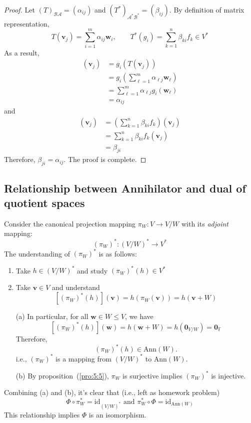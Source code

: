 \begin{proof}
Let $(T)_{\mathcal{B}\mathcal{A}}=(\alpha_{ij})$ and
$(T^*)_{\mathcal{A}^*\mathcal{B}^*}=(\beta_{ij})$.
By definition of matrix representation, 
\[
T(\bm v_j) = \sum_{i=1}^m\alpha_{ij}\bm w_i,\qquad
T^*(g_i) =  \sum_{k=1}^n\beta_{ki}f_k\in V^*
\]
As a result,
\begin{align*}
[T^*(g_i)](\bm v_j) &= g_i(T(\bm v_j)) \\&= g_i\left(\sum_{\ell=1}^m\alpha_{\ell j}\bm w_\ell\right)\\
&=\sum_{\ell=1}^m\alpha_{\ell j}g_i(\bm w_\ell)\\
&=\alpha_{ij}
\end{align*}
and
\begin{align*}
[T^*(g_i)](\bm v_j)&=
\left(\sum_{k=1}^n\beta_{ki}f_k\right)(\bm v_j)\\&=\sum_{k=1}^n\beta_{ki}f_k(\bm v_j)\\
&=\beta_{ji}
\end{align*}
Therefore, $\beta_{ji}=\alpha_{ij}$. The proof is complete.
\end{proof}

\subsection{Relationship between Annihilator and dual of quotient spaces}

\begin{example}
Consider the canonical projection mapping $\pi_W:V\to V/W$ with its \emph{adjoint} mapping:
\[
(\pi_W)^*:(V/W)^*\to V^*
\]
The understanding of $(\pi_W)^*$ is as follows:
\begin{enumerate}
\item
Take $h\in(V/W)^*$ and study $(\pi_W)^*(h)\in V^*$
\item
Take $\bm v\in V$ and understand 
\[
[(\pi_W)^*(h)](\bm v)=h(\pi_W(\bm v))=h(\bm v+W)
\]
\end{enumerate}
\begin{enumerate}
\item[(a)]
In particular, for all $\bm w\in W\le V$, we have
\[
[(\pi_W)^*(h)](\bm w) = h(\bm w+W) = h(\bm0_{V/W}) = \bm0_{\mathbb{F}}
\]
Therefore, 
\[
(\pi_W)^*(h)\in\text{Ann}(W).
\]
i.e., $(\pi_W)^*$ is a mapping from $(V/W)^*$ to $\text{Ann}(W)$.
\item[(b)]
By proposition~(\ref{pro:5:5}), $\pi_W$ is surjective implies $(\pi_W)^*$ is injective.
\end{enumerate}
Combining (a) and (b), it's clear that (i.e., left as homework problem)
\[
\Phi\circ \pi_W^* = \text{id}_{(V/W)^*} \text{ and }\pi_W^*\circ\Phi=\text{id}_{\text{Ann}(W)}
\]
This relationship implies $\Phi$ is an isomorphism.
\end{example}





















